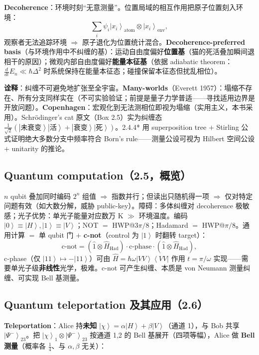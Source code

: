 \documentclass[11pt]{ctexart}
\newcommand{\ket}[1]{\left|#1\right\rangle}
\newcommand{\bra}[1]{\left\langle#1\right|}
\newcommand{\op}[1]{\hat{#1}}
\begin{document}
\textbf{Decoherence}：环境时刻``无意测量''。位置局域的相互作用把原子位置刻入环境：
\[
\sum_i\psi_i\ket{x_i}_{\text{atom}}\otimes\ket{x_i}_{\text{env}},
\]
观察者无法追踪环境 $\Rightarrow$ 原子退化为位置统计混合。\textbf{Decoherence-preferred basis}（与环境作用中不纠缠的基）：运动自由度偏好\textbf{位置基}（猫的死活叠加瞬间退相干的原因）；微观内部自由度偏好\textbf{能量本征基}（依据 adiabatic theorem：$\frac{d}{dt}E_n\ll\hbar\Delta^2$ 时系统保持在能量本征态；碰撞保留本征态但扰乱相位）。

\textbf{诠释}：纠缠不可避免地扩张至全宇宙。\textbf{Many-worlds}（Everett 1957）：塌缩不存在、所有分支同样实在（不可实验验证；前提是量子力学普适——寻找适用边界是开放问题）。\textbf{Copenhagen}：宏观化到无法测相位即视为塌缩（实用主义，本书采用）。Schrödinger's cat 原文（Box 2.5）实为纠缠态 $\frac{1}{\sqrt2}(\ket{\text{未衰变}}\ket{\text{活}}+\ket{\text{衰变}}\ket{\text{死}})$。2.4.4* 用 superposition tree $+$ Stirling 公式证明绝大多数分支中频率符合 Born's rule——测量公设可视为 Hilbert 空间公设 $+$ unitarity 的推论。

\subsection{Quantum computation（2.5，概览）}

$n$ qubit 叠加同时编码 $2^n$ 组值 $\Rightarrow$ 指数并行；但读出只随机得一项 $\Rightarrow$ 仅对特定问题有效（如大数分解，威胁 public-key）。障碍：多体纠缠对 decoherence 极敏感；光子优势：单光子能量对应数万 K $\gg$ 环境温度。编码 $\ket0\equiv\ket H,\ket1\equiv\ket V$；NOT $=$ HWP@$3\pi/8$；Hadamard $=$ HWP@$\pi/8$。通用计算 $=$ 单 qubit 门 $+$ \textbf{c-not}（control 为 $\ket1$ 时翻转 target）：
\[
\text{c-not}=(\op1\otimes\op H_{\mathrm{Had}})\cdot\text{c-phase}\cdot(\op1\otimes\op H_{\mathrm{Had}}),
\]
c-phase（仅 $\ket{11}\mapsto-\ket{11}$）可由 $\op H=\hbar\omega\ket{VV}\bra{VV}$ 作用 $t=\pi/\omega$ 实现——需要单光子级\textbf{非线性}光学，极难。c-not 可产生纠缠、本质是 von Neumann 测量纠缠、可实现 Bell 基测量。

\subsection{Quantum teleportation 及其应用（2.6）}

\textbf{Teleportation}：Alice 持\textbf{未知} $\ket\chi=\alpha\ket H+\beta\ket V$（通道 1），与 Bob 共享 $\ket{\Psi^-}_{23}$。把 $\ket\chi_1\otimes\ket{\Psi^-}_{23}$ 按通道 1,2 的 Bell 基展开（四项等幅），Alice 做 \textbf{Bell 测量}（概率各 $\tfrac14$、与 $\alpha,\beta$ 无关）：
\end{document}

